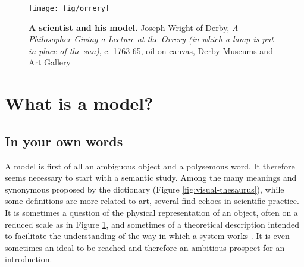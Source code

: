 \documentclass[a4paper,12pt,twoside,onecolumn,openright,final,oldfontcommands]{memoir}
\begin{document}
\begin{figure}

{\centering \texttt{[image: fig/orrery]} 

}

\caption[A scientist and his model]{\textbf{A scientist and his model.} Joseph Wright
of Derby, \emph{A Philosopher Giving a Lecture at the Orrery (in which a
lamp is put in place of the sun)}, c. 1763-65, oil on canvas, Derby
Museums and Art Gallery}\label{fig:orrery}
\end{figure}






\section{What is a model?}\label{what-is-a-model}

\subsection{In your own words}\label{in-your-own-words}

A model is first of all an ambiguous object and a polysemous word. It
therefore seems necessary to start with a semantic study. Among the many
meanings and synonymous proposed by the dictionary (Figure
\ref{fig:visual-thesaurus}), while some definitions are more related to
art, several find echoes in scientific practice. It is sometimes a
question of the physical representation of an object, often on a reduced
scale as in Figure \ref{fig:orrery}, and sometimes of a theoretical
description intended to facilitate the understanding of the way in which
a system works \citep{dictionnarymodel}. It is even sometimes an ideal
to be reached and therefore an ambitious prospect for an introduction.
\end{document}
